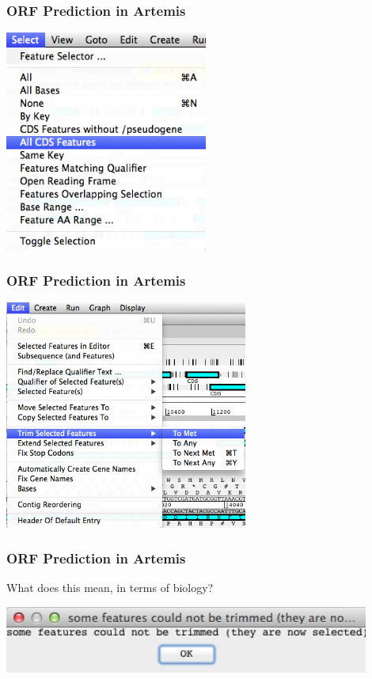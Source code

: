 \documentclass[table]{beamer}
\begin{document}
    \begin{frame}
      \frametitle{ORF Prediction in Artemis}    
      \begin{center}
        \includegraphics[width=0.5\textwidth]{images/artemis_orf7}     
      \end{center}
    \end{frame}

    \begin{frame}
      \frametitle{ORF Prediction in Artemis}    
      \begin{center}
        \includegraphics[width=0.6\textwidth]{images/artemis_orf8}     
      \end{center}
    \end{frame}

    \begin{frame}
      \frametitle{ORF Prediction in Artemis}
      What does this mean, in terms of biology?
      \begin{center}
        \includegraphics[width=0.9\textwidth]{images/artemis_orf9}     
      \end{center}
    \end{frame}
\end{document}
